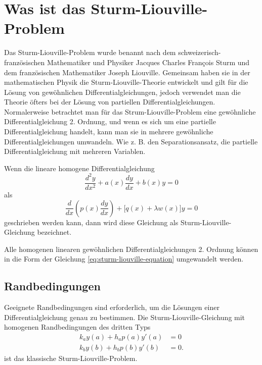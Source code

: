 %
%
%

%

\section{Was ist das Sturm-Liouville-Problem\label{sturmliouville:section:teil0}}
Das Sturm-Liouville-Problem wurde benannt nach dem schweizerisch-französischen
Mathematiker und Physiker Jacques Charles Fran\c{c}ois Sturm und dem
französischen Mathematiker Joseph Liouville.
Gemeinsam haben sie in der mathematischen Physik die Sturm-Liouville-Theorie
entwickelt und gilt für die Lösung von gewöhnlichen Differentialgleichungen,
jedoch verwendet man die Theorie öfters bei der Lösung von partiellen
Differentialgleichungen.
Normalerweise betrachtet man für das Strum-Liouville-Problem eine gewöhnliche
Differentialgleichung 2. Ordnung, und wenn es sich um eine partielle
Differentialgleichung handelt, kann man sie in mehrere gewöhnliche
Differentialgleichungen umwandeln. Wie z. B. den Separationsansatz, die
partielle Differentialgleichung mit mehreren Variablen.

\begin{definition}
Wenn die lineare homogene Differentialgleichung
\begin{equation}
	\frac{d^2y}{dx^2} + a(x)\frac{dy}{dx} + b(x)y = 0
\end{equation}
als
\begin{equation}
	\label{eq:sturm-liouville-equation}
	\frac{d}{dx} (p(x) \frac{dy}{dx}) + \lbrack q(x) +
	\lambda w(x) \rbrack y
	=
	0 
\end{equation}
geschrieben werden kann, dann wird diese Gleichung als Sturm-Liouville-Gleichung
bezeichnet.
\end{definition}
Alle homogenen linearen gewöhnlichen Differentialgleichungen 2. Ordnung können
in die Form der Gleichung \eqref{eq:sturm-liouville-equation} umgewandelt
werden.

\subsection{Randbedingungen\label{sub:was-ist-das-slp-randbedingungen}}
Geeignete Randbedingungen sind erforderlich, um die Lösungen einer
Differentialgleichung genau zu bestimmen.
Die Sturm-Liouville-Gleichung mit homogenen Randbedingungen des dritten Typs
\begin{equation}
	\begin{aligned}
		\label{eq:randbedingungen}
		k_a y(a) + h_a p(a) y'(a) &= 0 \\
		k_b y(b) + h_b p(b) y'(b) &= 0.
	\end{aligned}
\end{equation}
ist das klassische Sturm-Liouville-Problem.


